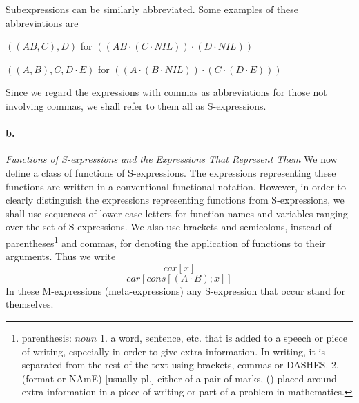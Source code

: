 \documentclass[11pt, a4paper]{article}
\begin{document}
Subexpressions can be similarly abbreviated. Some examples of these
abbreviations are
\begin{center}
  $((AB, C), D)$ for $((AB \cdot (C \cdot NIL)) \cdot (D \cdot NIL))$
\end{center}
\begin{center}
  $((A, B), C, D \cdot E)$ for
  $((A \cdot (B \cdot NIL)) \cdot (C \cdot (D \cdot E)))$
\end{center}

Since we regard the expressions with commas as abbreviations for those not
involving commas, we shall refer to them all as S-expressions.

\paragraph{b.}\textit{Functions of S-expressions and the Expressions That
  Represent Them}
We now define a class of functions of S-expressions. The expressions
representing these functions are written in a conventional functional
notation. However, in order to clearly distinguish the expressions representing
functions from S-expressions, we shall use sequences of lower-case letters for
function names and variables ranging over the set of S-expressions. We also use
brackets and semicolons, instead of
parentheses\footnote{parenthesis: $noun$ 1. a word, sentence, etc. that is added
  to a speech or piece of writing, especially in order to give extra
  information. In writing, it is separated from the rest of the text using
  brackets, commas or DASHES. 2. (format or NAmE) [usually pl.] either of a pair
  of marks, () placed around extra information in a piece of writing or part of
  a problem in mathematics.}
and commas, for denoting the
application of functions to their arguments. Thus we write
$$ car[x] $$
$$ car[cons[(A \cdot B); x]] $$
In these M-expressions (meta-expressions) any S-expression that occur stand for
themselves.
\end{document}
